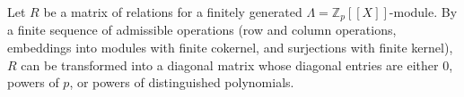 Let $R$ be a matrix of relations for a finitely generated $\Lambda = \mathbb{Z}_p[[X]]$-module. By a finite sequence of admissible operations (row and column operations, embeddings into modules with finite cokernel, and surjections with finite kernel), $R$ can be transformed into a diagonal matrix whose diagonal entries are either $0$, powers of $p$, or powers of distinguished polynomials.
